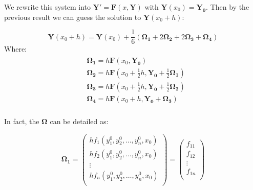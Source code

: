 \documentclass[a4paper]{article}
\begin{document}
We rewrite this system into $\mathbf{Y'}=\mathbf{F}(x,\mathbf{Y})$ with $\mathbf{Y}({{x}_{0}})={{\mathbf{Y}}_{\mathbf{0}}}$. Then by the previous result we can guess the solution to $\mathbf{Y}({{x}_{0}}+h)$:

\begin{equation}
\mathbf{Y}\left( {{x}_{0}}+h \right)=\mathbf{Y}\left( {{x}_{0}} \right)+\frac{1}{6}\left( {{\mathbf{\Omega }}_{\mathbf{1}}}+2{{\mathbf{\Omega }}_{\mathbf{2}}}+2{{\mathbf{\Omega }}_{\mathbf{3}}}+{{\mathbf{\Omega }}_{\mathbf{4}}} \right)
\end{equation}
Where:
\begin{eqnarray}     %
\left.                       %
\begin{array}{lll}       %
& {{\mathbf{\Omega }}_{\mathbf{1}}}=h\mathbf{F}\left( {{x}_{0}},{{\mathbf{Y}}_{\mathbf{0}}} \right) \\
& {{\mathbf{\Omega }}_{\mathbf{2}}}=h\mathbf{F}\left( {{x}_{0}}+\tfrac{1}{2}h,{{\mathbf{Y}}_{\mathbf{0}}}+\tfrac{1}{2}{{\mathbf{\Omega }}_{\mathbf{1}}} \right) \\
& {{\mathbf{\Omega }}_{\mathbf{3}}}=h\mathbf{F}\left( {{x}_{0}}+\tfrac{1}{2}h,{{\mathbf{Y}}_{\mathbf{0}}}+\tfrac{1}{2}{{\mathbf{\Omega }}_{\mathbf{2}}} \right) \\
& {{\mathbf{\Omega }}_{\mathbf{4}}}=h\mathbf{F}\left( {{x}_{0}}+h,{{\mathbf{Y}}_{\mathbf{0}}}+{{\mathbf{\Omega }}_{\mathbf{3}}} \right) \\
\end{array}              %
\right.                       %
\end{eqnarray}

In fact, the $\mathbf{\Omega }$ can be detailed as:

\begin{equation}
{{\mathbf{\Omega }}_{\mathbf{1}}}=\left( \begin{matrix}
   h{{f}_{1}}(y_{1}^{0},y_{2}^{0},\ldots ,y_{n}^{0},{{x}_{0}})  \\
   h{{f}_{2}}(y_{1}^{0},y_{2}^{0},\ldots ,y_{n}^{0},{{x}_{0}})  \\
   \vdots   \\
   h{{f}_{n}}(y_{1}^{0},y_{2}^{0},\ldots ,y_{n}^{0},{{x}_{0}})  \\
\end{matrix} \right)=\left( \begin{matrix}
   {{f}_{11}}  \\
   {{f}_{12}}  \\
   \vdots   \\
   {{f}_{1n}}  \\
\end{matrix} \right)
\end{equation}
\end{document}
